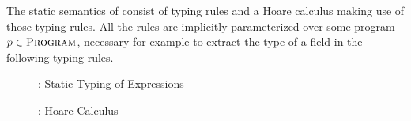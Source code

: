 The static semantics of \svl consist of typing rules and a Hoare calculus making use of those typing rules.
All the rules are implicitly parameterized over some program $p \in \textsc{Program}$, necessary for example to extract the type of a field in the following typing rules.

\begin{figure}[h]
    
    \caption{\svl: Static Typing of Expressions}
\end{figure}

\begin{figure}[h!]
    
    \caption{\svl: Hoare Calculus} 
\end{figure}


%